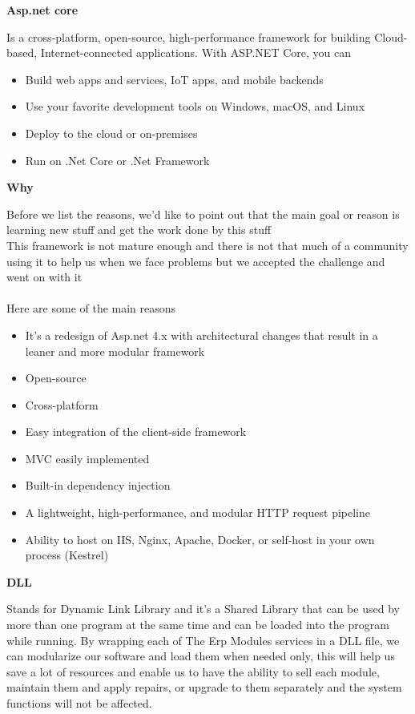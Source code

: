 \begin{adjustwidth}{2cm}{}
    \textbf{Asp.net core}
    \begin{adjustwidth}{1cm}{}
        Is a cross-platform, open-source, high-performance framework for building 
      Cloud-based, Internet-connected applications. With ASP.NET Core, you can
      \begin{itemize}
        \item Build web apps and services, IoT apps, and mobile backends
        \item Use your favorite development tools on Windows, macOS, and Linux
        \item Deploy to the cloud or on-premises
        \item Run on .Net Core or .Net Framework
      \end{itemize}
    \end{adjustwidth}
    \textbf{Why}
    \begin{adjustwidth}{1cm}{}
        Before we list the reasons, we’d like to point out that the main goal or reason
      is learning new stuff and get the work done by this stuff\\
      This framework is not mature enough and there is not that much of a community using it to help us when we face problems but we accepted the challenge and went on with it
      \\\\
      Here are some of the main reasons
      \begin{itemize}
        \item It’s a redesign of Asp.net 4.x with architectural changes that result in a leaner and more modular framework
        \item Open-source
        \item Cross-platform
        \item Easy integration of the client-side framework
        \item MVC easily implemented
        \item Built-in dependency injection
        \item A lightweight, high-performance, and modular HTTP request pipeline
        \item Ability to host on IIS, Nginx, Apache, Docker, or self-host in your own process (Kestrel)
      \end{itemize}
    \end{adjustwidth}
    \textbf{DLL}
    \begin{adjustwidth}{1cm}{}
        Stands for Dynamic Link Library and it’s a Shared Library that can be used by more than one program at the same time and can be loaded into the program while running.
By wrapping each of The Erp Modules services in a DLL file, we can modularize our software and load them when needed only, this will help us save a lot of resources and enable us to have the ability to sell each module, maintain them and apply repairs, or upgrade to them separately and the system functions will not be affected.
\\\\
    \end{adjustwidth}
\end{adjustwidth}


